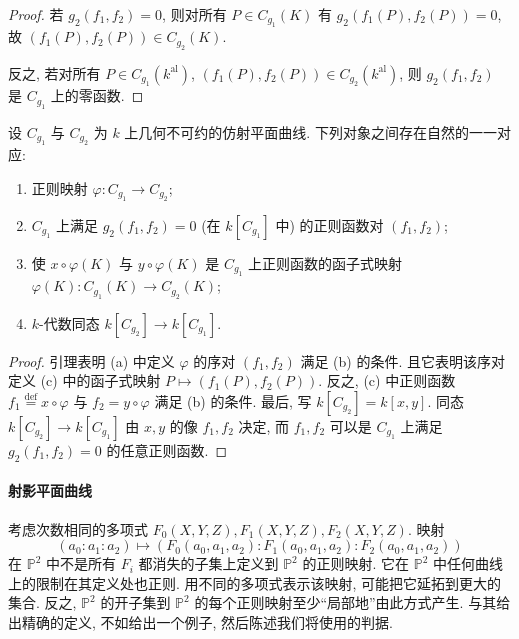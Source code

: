 \begin{proof}
若 $g_2(f_1,f_2) = 0$, 则对所有 $P\in C_{g_1}(K)$ 有 $g_2(f_1(P), f_2(P)) = 0$, 故 $(f_1(P), f_2(P))\in C_{g_2}(K)$.

反之, 若对所有 $P\in C_{g_1}(k^{\mathrm{al}})$, $(f_1(P), f_2(P))\in C_{g_2}(k^{\mathrm{al}})$, 则 $g_2(f_1,f_2)$ 是 $C_{g_1}$ 上的零函数.
\end{proof}

\begin{proposition} \label{thm:1.4.16} 
设 $C_{g_1}$ 与 $C_{g_2}$ 为 $k$ 上几何不可约的仿射平面曲线. 下列对象之间存在自然的一一对应:
\begin{enumerate}[label=\textup{(\alph*)}]
\item 正则映射 $\varphi\colon C_{g_1}\to C_{g_2}$;
\item $C_{g_1}$ 上满足 $g_2(f_1,f_2) = 0$ (在 $k[C_{g_1}]$ 中) 的正则函数对 $(f_1,f_2)$;
\item 使 $x\circ\varphi(K)$ 与 $y\circ\varphi(K)$ 是 $C_{g_1}$ 上正则函数的函子式映射 $\varphi(K)\colon C_{g_1}(K)\to C_{g_2}(K)$;
\item $k$-代数同态 $k[C_{g_2}]\to k[C_{g_1}]$.
\end{enumerate}
\end{proposition}

\begin{proof}
引理表明 (a) 中定义 $\varphi$ 的序对 $(f_1,f_2)$ 满足 (b) 的条件. 且它表明该序对定义 (c) 中的函子式映射 $P\mapsto(f_1(P), f_2(P))$. 反之, (c) 中正则函数 $f_1 \overset{\text{def}}{=} x\circ\varphi$ 与 $f_2 = y\circ\varphi$ 满足 (b) 的条件. 最后, 写 $k[C_{g_2}] = k[x,y]$. 同态 $k[C_{g_2}]\to k[C_{g_1}]$ 由 $x, y$ 的像 $f_1, f_2$ 决定, 而 $f_1, f_2$ 可以是 $C_{g_1}$ 上满足 $g_2(f_1,f_2) = 0$ 的任意正则函数.
\end{proof}

\paragraph{射影平面曲线}
考虑次数相同的多项式 $F_0(X,Y,Z), F_1(X,Y,Z), F_2(X,Y,Z)$. 映射
\[
(a_0:a_1:a_2)\mapsto(F_0(a_0,a_1,a_2):F_1(a_0,a_1,a_2):F_2(a_0,a_1,a_2))
\]
在 $\mathbb{P}^2$ 中不是所有 $F_i$ 都消失的子集上定义到 $\mathbb{P}^2$ 的正则映射. 它在 $\mathbb{P}^2$ 中任何曲线上的限制在其定义处也正则. 用不同的多项式表示该映射, 可能把它延拓到更大的集合. 反之, $\mathbb{P}^2$ 的开子集到 $\mathbb{P}^2$ 的每个正则映射至少``局部地''由此方式产生. 与其给出精确的定义, 不如给出一个例子, 然后陈述我们将使用的判据.

